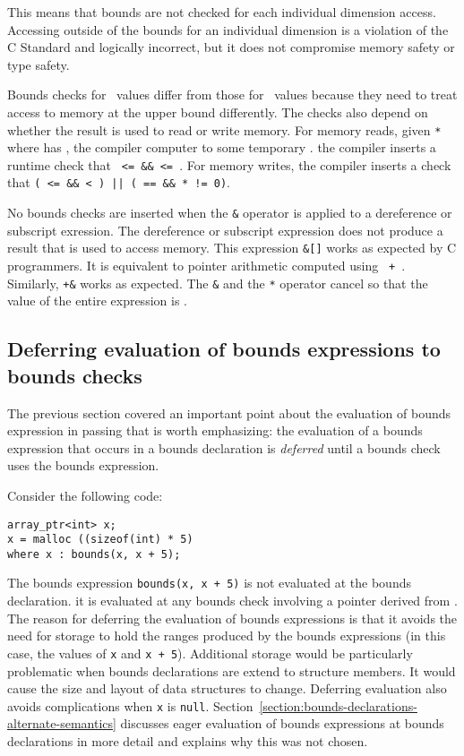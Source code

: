This means that bounds are not checked for each individual dimension access.
Accessing outside of the bounds for an
individual dimension is a violation of the C Standard and logically incorrect,
but it does not compromise memory safety or type safety.

Bounds checks for \ntarrayptr\ values differ from those for
\arrayptr\ values because they need to treat access to
memory at the upper bound differently.  The checks also depend on
whether the result is used to read or write memory.   For memory reads,
given \texttt{*} where {} has {}, 
the compiler computer  to some temporary .
the compiler inserts a runtime check that  \texttt{ <=  \&\&
 <= }.   For memory writes, the compiler inserts a check that 
\texttt{( <=  \&\&  < ) ||
( == \&\& * != 0)}.

No bounds checks are inserted when the \texttt{\&} operator is applied to 
a dereference or subscript exression.    
The dereference or subscript expression does not produce a result that is used
to access memory.  This expression \texttt{\&[]} works as
expected by C programmers.  It is equivalent to pointer arithmetic computed using 
\texttt{ + }.   Similarly, \texttt{+\&} works 
as expected.  The \texttt{\&} and the \texttt{*} operator cancel so that
the value of the entire expression is .

\subsection{Deferring evaluation of bounds expressions to bounds checks}

The previous section covered an important point about the evaluation of
bounds expression in passing that is worth emphasizing:
the evaluation of a bounds expression that occurs in
a bounds declaration is {\em deferred} until a bounds check uses the
bounds expression.

Consider the following code:

\begin{verbatim}
array_ptr<int> x;
x = malloc ((sizeof(int) * 5)
where x : bounds(x, x + 5);
\end{verbatim}

The bounds expression \texttt{bounds(x, x + 5)} is not evaluated at the
bounds declaration.   it is evaluated at any bounds check involving a
pointer derived from .  The reason for deferring the
evaluation of bounds expressions is that it avoids the need for
storage to hold the ranges produced by the bounds
expressions (in this case, the values of \texttt{x} and \texttt{x + 5}).
Additional storage would be particularly
problematic when bounds declarations are extend to structure members.
It would cause the size and layout of data structures to change.
Deferring evaluation also avoids complications when \texttt{x} is
\texttt{null}. Section~\ref{section:bounds-declarations-alternate-semantics} 
discusses eager evaluation of bounds expressions at
bounds declarations in more detail and explains why this was not chosen.

